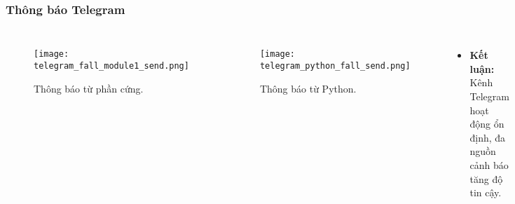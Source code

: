 \begin{frame}[t,fragile]
\frametitle{Thông báo Telegram}
\begin{columns}[T]
    \begin{figure}[H]
        \centering
        \texttt{[image: telegram\_fall\_module1\_send.png]}
        \caption{Thông báo từ phần cứng.}
    \end{figure}
    \begin{figure}[H]
        \centering
        \texttt{[image: telegram\_python\_fall\_send.png]}
        \caption{Thông báo từ Python.}
    \end{figure}
    \begin{itemize}
        \item \textbf{Kết luận:} Kênh Telegram hoạt động ổn định, đa nguồn cảnh báo tăng độ tin cậy.
    \end{itemize}
\end{columns}
\end{frame}
